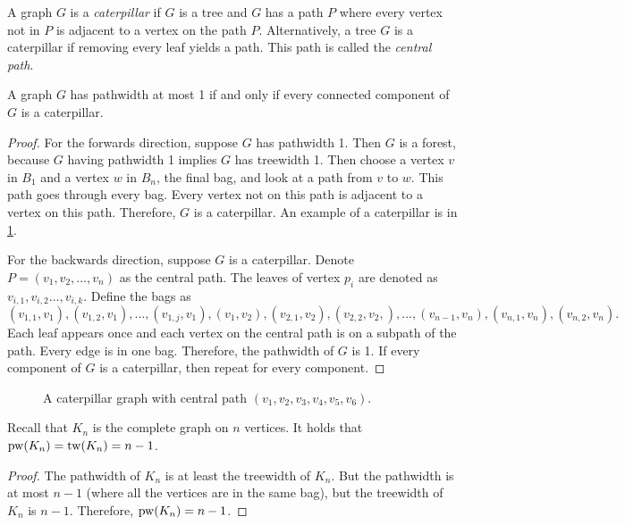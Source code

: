 A graph \(G\) is a \textit{caterpillar} if \(G\) is a tree and $G$ has a path \(P\) where every vertex not in $P$ is adjacent to a vertex on the path \(P\). Alternatively, a tree \(G\) is a caterpillar if removing every leaf yields a path. This path is called the \textit{central path}.
\begin{proposition}
	A graph $G$ has pathwidth at most 1 if and only if every connected component of $G$ is a caterpillar.
\end{proposition}
\begin{proof}
	For the forwards direction, suppose \(G\) has pathwidth 1. Then $G$ is a forest, because $G$ having pathwidth 1 implies $G$ has treewidth 1. Then choose a vertex \(v\) in \(B_1\) and a vertex \(w\) in \(B_n\), the final bag, and look at a path from \(v\) to \(w\). This path goes through every bag. Every vertex not on this path is adjacent to a vertex on this path. Therefore, $G$ is a caterpillar. 
	An example of a caterpillar is in \cref{fig:caterpillar}.

	For the backwards direction, suppose \(G\) is a caterpillar.
	Denote \(P =\left( v_1, v_2, \ldots, v_n\right)\) as the central path. The leaves of vertex \(p_i\) are denoted as \(v_{i, 1}, v_{i, 2} \dots, v_{i, k}\). Define the bags as
	\begin{equation*}
		(v_{1, 1}, v_1), (v_{1, 2}, v_1) ,\ldots ,(v_{1, j}, v_1),  (v_1, v_2), (v_{2, 1}, v_2), (v_{2,2}, v_2,),\ldots ,(v_{n-1}, v_n), (v_{n,1}, v_n), (v_{n,2}, v_n) .
	\end{equation*}
	Each leaf appears once and each vertex on the central path is on a subpath of the path. Every edge is in one bag. Therefore, the pathwidth of \(G\) is 1. If every component of $G$ is a caterpillar, then repeat for every component.
\end{proof}
\begin{figure}[h!]
	\centering
	
	\caption[Caterpillar graph]{A caterpillar graph with central path \((v_1, v_2, v_3, v_4, v_5, v_6)\).}\label{fig:caterpillar}
\end{figure}

\begin{example}
	Recall that $K_n$ is the complete graph on $n$ vertices. It holds that \(\operatorname{pw}(K_n) = \operatorname{tw}(K_n) = n - 1\).
\end{example}
\begin{proof}
	The pathwidth of \(K_n\) is at least the treewidth of \(K_n\). But the pathwidth is at most \(n- 1\) (where all the vertices are in the same bag), but the treewidth of \(K_n\) is \(n - 1\). Therefore, \(\operatorname{pw}(K_n) = n - 1\).
\end{proof}

